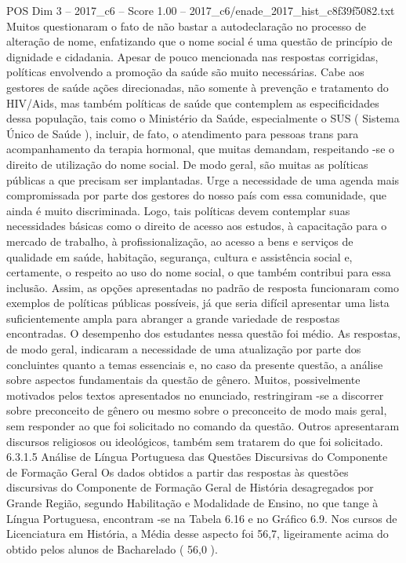 \begin{textsample}{POS Dim 3 – 2017\_c6 – Score 1.00 – 2017\_c6/enade\_2017\_hist\_c8f39f5082.txt}
Muitos questionaram o fato de não bastar a autodeclaração no processo de alteração de nome, enfatizando que o nome social é uma questão de princípio de dignidade e cidadania.
Apesar de pouco mencionada nas respostas corrigidas, políticas envolvendo a promoção da saúde são muito necessárias.
Cabe aos gestores de saúde ações direcionadas, não somente à prevenção e tratamento do HIV/Aids, mas também políticas de saúde que contemplem as especificidades dessa população, tais como o Ministério da Saúde, especialmente o SUS ( Sistema Único de Saúde ), incluir, de fato, o atendimento para pessoas trans para acompanhamento da terapia hormonal, que muitas demandam, respeitando -se o direito de utilização do nome social.
De modo geral, são muitas as políticas públicas a que precisam ser implantadas.
Urge a necessidade de uma agenda mais compromissada por parte dos gestores do nosso país com essa comunidade, que ainda é muito discriminada.
Logo, tais políticas devem contemplar suas necessidades básicas como o direito de acesso aos estudos, à capacitação para o mercado de trabalho, à profissionalização, ao acesso a bens e serviços de qualidade em saúde, habitação, segurança, cultura e assistência social e, certamente, o respeito ao uso do nome social, o que também contribui para essa inclusão.
Assim, as opções apresentadas no padrão de resposta funcionaram como exemplos de políticas públicas possíveis, já que seria difícil apresentar uma lista suficientemente ampla para abranger a grande variedade de respostas encontradas.
O desempenho dos estudantes nessa questão foi médio.
As respostas, de modo geral, indicaram a necessidade de uma atualização por parte dos concluintes quanto a temas essenciais e, no caso da presente questão, a análise sobre aspectos fundamentais da questão de gênero.
Muitos, possivelmente motivados pelos textos apresentados no enunciado, restringiram -se a discorrer sobre preconceito de gênero ou mesmo sobre o preconceito de modo mais geral, sem responder ao que foi solicitado no comando da questão.
Outros apresentaram discursos religiosos ou ideológicos, também sem tratarem do que foi solicitado. 6.3.1.5 Análise de Língua Portuguesa das Questões Discursivas do Componente de Formação Geral Os dados obtidos a partir das respostas às questões discursivas do Componente de Formação Geral de História desagregados por Grande Região, segundo Habilitação e Modalidade de Ensino, no que tange à Língua Portuguesa, encontram -se na Tabela 6.16 e no Gráfico 6.9.
Nos cursos de Licenciatura em História, a Média desse aspecto foi 56,7, ligeiramente acima do obtido pelos alunos de Bacharelado ( 56,0 ).

\end{textsample}
